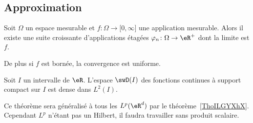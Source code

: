 
\subsection{Approximation}

\begin{lemma}      \label{LempTBaUw}
	Soit \( \Omega\) un espace mesurable et \( f\colon \Omega\to \mathopen[ 0 , \infty \mathclose]\) une application mesurable. Alors il existe une suite croissante d'applications étagées \( \varphi_n\colon \Omega\to \eR^+\) dont la limite est \( f\).

	De plus si \( f\) est bornée, la convergence est uniforme.
\end{lemma}

\begin{theorem}       \label{ThoJsBKir}
	Soit \( I\) un intervalle de \( \eR\). L'espace \( \swD(I)\) des fonctions continues à support compact sur \( I\) est dense dans \( L^2(I)\).
\end{theorem}
Ce théorème sera généralisé à tous les \( L^p(\eR^d)\) par le théorème~\ref{ThoILGYXhX}. Cependant \( L^p\) n'étant pas un Hilbert, il faudra travailler sans produit scalaire.

